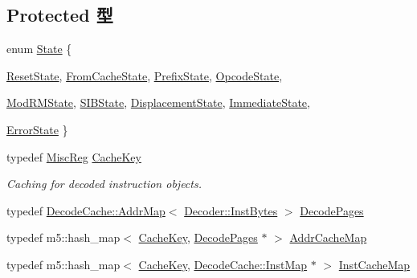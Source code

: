 \subsection*{Protected 型}
\begin{DoxyCompactItemize}
\item 
enum \hyperlink{classX86ISA_1_1Decoder_a5d74787dedbc4e11c1ab15bf487e61f8}{State} \{ \par
\hyperlink{classX86ISA_1_1Decoder_a5d74787dedbc4e11c1ab15bf487e61f8aff67699080f325de2a7ddc37e246c9a8}{ResetState}, 
\hyperlink{classX86ISA_1_1Decoder_a5d74787dedbc4e11c1ab15bf487e61f8abfa48baddbd48c27b1459423efa4bdd8}{FromCacheState}, 
\hyperlink{classX86ISA_1_1Decoder_a5d74787dedbc4e11c1ab15bf487e61f8a2991411af91f1d4a5045fff0a9a3be9f}{PrefixState}, 
\hyperlink{classX86ISA_1_1Decoder_a5d74787dedbc4e11c1ab15bf487e61f8a5dafe6854fcb6b0807bea9ce23744e64}{OpcodeState}, 
\par
\hyperlink{classX86ISA_1_1Decoder_a5d74787dedbc4e11c1ab15bf487e61f8a1b1909a7067c96c6fa9205417b64bb29}{ModRMState}, 
\hyperlink{classX86ISA_1_1Decoder_a5d74787dedbc4e11c1ab15bf487e61f8add2ba2a6d04fb8829afac6fcb5a57283}{SIBState}, 
\hyperlink{classX86ISA_1_1Decoder_a5d74787dedbc4e11c1ab15bf487e61f8a6914e5c19cf114014f9ab8d94169c880}{DisplacementState}, 
\hyperlink{classX86ISA_1_1Decoder_a5d74787dedbc4e11c1ab15bf487e61f8ae16af2d7c02e47eb62cd45a6fe42f48f}{ImmediateState}, 
\par
\hyperlink{classX86ISA_1_1Decoder_a5d74787dedbc4e11c1ab15bf487e61f8ade97a2665a1361faea090134062c17b4}{ErrorState}
 \}
\item 
typedef \hyperlink{namespaceX86ISA_aa16539aa6584fd12f7d6fa868f75b4de}{MiscReg} \hyperlink{classX86ISA_1_1Decoder_af5cdf239a38ca71d83ddcf2b9a657cbe}{CacheKey}
\begin{DoxyCompactList}\small\item\em Caching for decoded instruction objects. \item\end{DoxyCompactList}\item 
typedef \hyperlink{classDecodeCache_1_1AddrMap}{DecodeCache::AddrMap}$<$ \hyperlink{structX86ISA_1_1Decoder_1_1InstBytes}{Decoder::InstBytes} $>$ \hyperlink{classX86ISA_1_1Decoder_aaeb98acb07222e8d393baae60333dd32}{DecodePages}
\item 
typedef m5::hash\_\-map$<$ \hyperlink{classX86ISA_1_1Decoder_af5cdf239a38ca71d83ddcf2b9a657cbe}{CacheKey}, \hyperlink{classDecodeCache_1_1AddrMap}{DecodePages} $\ast$ $>$ \hyperlink{classX86ISA_1_1Decoder_a17e66c491b538e223da13acf9d77d5f2}{AddrCacheMap}
\item 
typedef m5::hash\_\-map$<$ \hyperlink{classX86ISA_1_1Decoder_af5cdf239a38ca71d83ddcf2b9a657cbe}{CacheKey}, \hyperlink{namespaceDecodeCache_ac4aa7140c72815d25936c8dcf04191f1}{DecodeCache::InstMap} $\ast$ $>$ \hyperlink{classX86ISA_1_1Decoder_accbfac5b46e737fd6326272fba1a8bb2}{InstCacheMap}
\end{DoxyCompactItemize}
